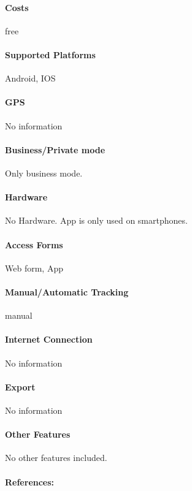 \paragraph{Costs} free
\paragraph{Supported Platforms} Android, IOS
\paragraph{GPS} No information
\paragraph{Business/Private mode} Only business mode.
\paragraph{Hardware} No Hardware. App is only used on smartphones.
\paragraph{Access Forms}Web form, App
\paragraph{Manual/Automatic Tracking} manual
\paragraph{Internet Connection} No information
\paragraph{Export} No information
\paragraph{Other Features} No other features included.
\paragraph{References:} \cite{Trucker_Logbook}
\newpage

